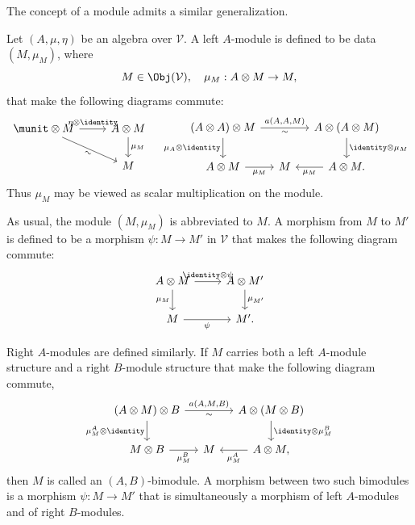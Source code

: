 The concept of a module admits a similar generalization.

\begin{definition}[Module]\label{def:module-algebra}
	Let $(A,\mu,\eta)$ be an algebra over $\mathcal{V}$. A left $A$-module is
	defined to be data $(M,\mu_M)$, where
	\[ M \in \Obj(\mathcal{V}), \quad \mu_M: A \otimes M \to M, \]
	that make the following diagrams commute:
	\[\begin{tikzcd}
		\munit \otimes M \arrow[r, "{\eta \otimes \identity}"] \arrow[rd, "\sim"' sloped] & A \otimes M \arrow[d, "{\mu_M}"] \\
		& M
	\end{tikzcd} \quad \begin{tikzcd}[column sep=small]
		(A \otimes A) \otimes M \arrow[rr, "{a(A, A, M)}", "\sim"'] \arrow[d, "{\mu_A \otimes \identity}"'] & & A \otimes (A \otimes M) \arrow[d, "{\identity \otimes \mu_M}"] \\
		A \otimes M \arrow[r, "{\mu_M}"'] & M & A \otimes M \arrow[l, "{\mu_M}"] .
	\end{tikzcd}\]
	Thus $\mu_M$ may be viewed as scalar multiplication on the module.
	
	As usual, the module $(M,\mu_M)$ is abbreviated to $M$. A morphism from
	$M$ to $M'$ is defined to be a morphism $\psi:M\to M'$ in $\mathcal{V}$
	that makes the following diagram commute:
	\[\begin{tikzcd}
		A \otimes M \arrow[d, "{\mu_M}"'] \arrow[r, "{\identity \otimes \psi}"] & A \otimes M' \arrow[d, "{\mu_{M'}}"] \\
		M \arrow[r, "\psi"'] & M' .
	\end{tikzcd}\]
	
	Right $A$-modules are defined similarly. If $M$ carries both a left
	$A$-module structure and a right $B$-module structure that make the
	following diagram commute,
	\[\begin{tikzcd}[column sep=small]
		(A \otimes M) \otimes B \arrow[rr, "{a(A, M, B)}", "\sim"'] \arrow[d, "{\mu_M^A \otimes \identity}"'] & & A \otimes (M \otimes B) \arrow[d, "{\identity \otimes \mu_M^B}"] \\
		M \otimes B \arrow[r, "{\mu_M^B}"'] & M & A \otimes M , \arrow[l, "{\mu_M^A}"]
	\end{tikzcd}\]
	then $M$ is called an $(A,B)$-bimodule. A morphism between two such
	bimodules is a morphism $\psi:M\to M'$ that is simultaneously a morphism
	of left $A$-modules and of right $B$-modules.
\end{definition}

